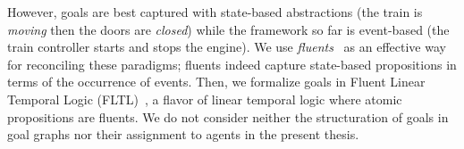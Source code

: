 However, goals are best captured with state-based abstractions (the train is \emph{moving} then the doors are \emph{closed}) while the framework so far is event-based (the train controller starts and stops the engine). We use \emph{fluents}~\cite{Miller:2002} as an effective way for reconciling these paradigms; fluents indeed capture state-based propositions in terms of the occurrence of events. Then, we formalize goals in Fluent Linear Temporal Logic (FLTL)~\cite{Giannakopoulou:2003}, a flavor of linear temporal logic where atomic propositions are fluents. We do not consider neither the structuration of goals in goal graphs nor their assignment to agents in the present thesis.




